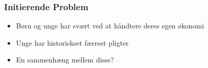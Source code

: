 \begin{frame}
\frametitle{Initierende Problem}
    \begin{itemize}
        \item{Børn og unge har svært ved at håndtere deres egen økonomi}
        \vspace{\baselineskip}
        \item{Unge har historiskset færrest pligter}
        \vspace{\baselineskip}
        \item{En sammenhæng mellem disse?}
        
    \end{itemize}
\end{frame}

